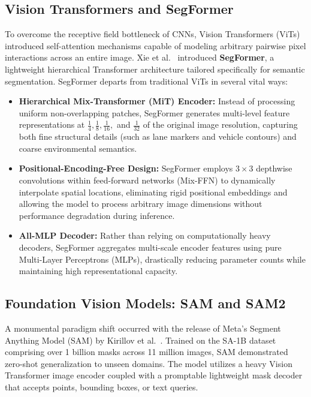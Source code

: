 \subsection{Vision Transformers and SegFormer}
To overcome the receptive field bottleneck of CNNs, Vision Transformers (ViTs) introduced self-attention mechanisms capable of modeling arbitrary pairwise pixel interactions across an entire image. Xie et al.~\cite{xie2021segformer} introduced \textbf{SegFormer}, a lightweight hierarchical Transformer architecture tailored specifically for semantic segmentation. SegFormer departs from traditional ViTs in several vital ways:
\begin{itemize}
    \item \textbf{Hierarchical Mix-Transformer (MiT) Encoder:} Instead of processing uniform non-overlapping patches, SegFormer generates multi-level feature representations at $\frac{1}{4}, \frac{1}{8}, \frac{1}{16},$ and $\frac{1}{32}$ of the original image resolution, capturing both fine structural details (such as lane markers and vehicle contours) and coarse environmental semantics.
    \item \textbf{Positional-Encoding-Free Design:} SegFormer employs $3 \times 3$ depthwise convolutions within feed-forward networks (Mix-FFN) to dynamically interpolate spatial locations, eliminating rigid positional embeddings and allowing the model to process arbitrary image dimensions without performance degradation during inference.
    \item \textbf{All-MLP Decoder:} Rather than relying on computationally heavy decoders, SegFormer aggregates multi-scale encoder features using pure Multi-Layer Perceptrons (MLPs), drastically reducing parameter counts while maintaining high representational capacity.
\end{itemize}

\subsection{Foundation Vision Models: SAM and SAM2}
A monumental paradigm shift occurred with the release of Meta's Segment Anything Model (SAM) by Kirillov et al.~\cite{kirillov2023segment}. Trained on the SA-1B dataset comprising over 1 billion masks across 11 million images, SAM demonstrated zero-shot generalization to unseen domains. The model utilizes a heavy Vision Transformer image encoder coupled with a promptable lightweight mask decoder that accepts points, bounding boxes, or text queries. 

